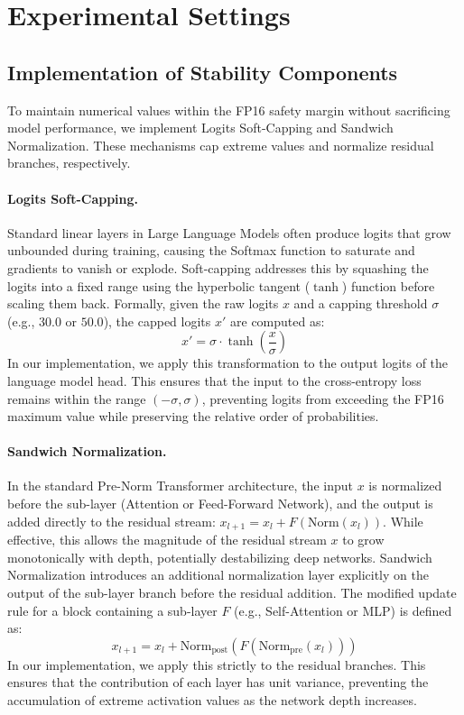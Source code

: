\section{Experimental Settings}
\label{sec:experiment_setting_details}

\subsection{Implementation of Stability Components}
\label{sec:implement_architecture}

To maintain numerical values within the FP16 safety margin without sacrificing model performance, we implement Logits Soft-Capping and Sandwich Normalization.
These mechanisms cap extreme values and normalize residual branches, respectively.

\paragraph{Logits Soft-Capping.}
Standard linear layers in Large Language Models often produce logits that grow unbounded during training, causing the Softmax function to saturate and gradients to vanish or explode.
Soft-capping addresses this by squashing the logits into a fixed range using the hyperbolic tangent ($\tanh$) function before scaling them back.
Formally, given the raw logits $x$ and a capping threshold $\sigma$ (e.g., $30.0$ or $50.0$), the capped logits $x'$ are computed as:
\begin{equation}
    x' = \sigma \cdot \tanh\left(\frac{x}{\sigma}\right)
\end{equation}
In our implementation, we apply this transformation to the output logits of the language model head.
This ensures that the input to the cross-entropy loss remains within the range $(-\sigma, \sigma)$, preventing logits from exceeding the FP16 maximum value while preserving the relative order of probabilities.

\paragraph{Sandwich Normalization.}
In the standard Pre-Norm Transformer architecture, the input $x$ is normalized before the sub-layer (Attention or Feed-Forward Network), and the output is added directly to the residual stream: $x_{l+1} = x_l + F(\text{Norm}(x_l))$.
While effective, this allows the magnitude of the residual stream $x$ to grow monotonically with depth, potentially destabilizing deep networks.
Sandwich Normalization introduces an additional normalization layer explicitly on the output of the sub-layer branch before the residual addition.
The modified update rule for a block containing a sub-layer $F$ (e.g., Self-Attention or MLP) is defined as:
\begin{equation}
    x_{l+1} = x_l + \text{Norm}_{\text{post}}\left( F(\text{Norm}_{\text{pre}}(x_l)) \right)
\end{equation}
In our implementation, we apply this strictly to the residual branches.
This ensures that the contribution of each layer has unit variance, preventing the accumulation of extreme activation values as the network depth increases.


